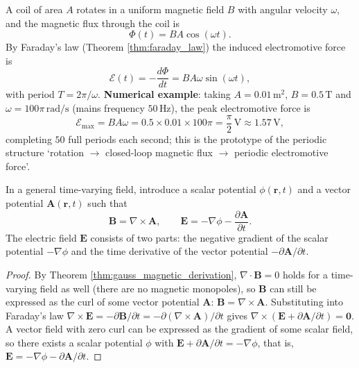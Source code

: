 \begin{example}\label{ex:ac_generator}
A coil of area $A$ rotates in a uniform magnetic field $B$ with angular velocity $\omega$, and the magnetic flux through the coil is
\[
\Phi(t) = BA\cos(\omega t).
\]
By Faraday's law (Theorem \ref{thm:faraday_law}) the induced electromotive force is
\[
\mathcal{E}(t) = -\frac{d\Phi}{dt} = BA\omega\sin(\omega t),
\]
with period $T = 2\pi/\omega$. \textbf{Numerical example}: taking $A = 0.01\,\text{m}^2$, $B = 0.5\,\text{T}$ and $\omega = 100\pi\,\text{rad/s}$ (mains frequency $50\,\text{Hz}$), the peak electromotive force is
\[
\mathcal{E}_{\max} = BA\omega = 0.5\times 0.01\times 100\pi = \frac{\pi}{2}\,\text{V} \approx 1.57\,\text{V},
\]
completing $50$ full periods each second; this is the prototype of the periodic structure `rotation $\to$ closed-loop magnetic flux $\to$ periodic electromotive force'.
\end{example}

\begin{theorem}\label{thm:scalar_vector_potential}
In a general time-varying field, introduce a scalar potential $\phi(\mathbf{r}, t)$ and a vector potential $\mathbf{A}(\mathbf{r}, t)$ such that
\[
\boxed{\mathbf{B} = \nabla \times \mathbf{A}}, \qquad
\boxed{\mathbf{E} = -\nabla \phi - \frac{\partial \mathbf{A}}{\partial t}}.
\]
The electric field $\mathbf{E}$ consists of two parts: the negative gradient of the scalar potential $-\nabla \phi$ and the time derivative of the vector potential $-\partial\mathbf{A}/\partial t$.
\end{theorem}

\begin{proof}
By Theorem \ref{thm:gauss_magnetic_derivation}, $\nabla \cdot \mathbf{B} = 0$ holds for a time-varying field as well (there are no magnetic monopoles), so $\mathbf{B}$ can still be expressed as the curl of some vector potential $\mathbf{A}$: $\mathbf{B} = \nabla \times \mathbf{A}$. Substituting into Faraday's law $\nabla\times\mathbf{E} = -\partial\mathbf{B}/\partial t = -\partial(\nabla\times\mathbf{A})/\partial t$ gives $\nabla\times(\mathbf{E} + \partial\mathbf{A}/\partial t) = \mathbf{0}$. A vector field with zero curl can be expressed as the gradient of some scalar field, so there exists a scalar potential $\phi$ with $\mathbf{E} + \partial\mathbf{A}/\partial t = -\nabla\phi$, that is, $\mathbf{E} = -\nabla\phi - \partial\mathbf{A}/\partial t$.
\end{proof}

